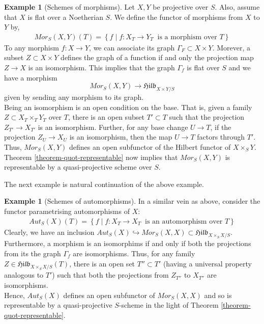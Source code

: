 \documentclass[11pt]{amsart}
\theoremstyle{definition}
\newtheorem{example}[theorem]{Example}
\begin{document}
\begin{example}[Schemes of morphisms]
	\label{example-parametrising-morphisms}
	Let $X, Y$ be projective over $S$. Also, assume that $X$ is flat over a Noetherian $S$. We define the functor of morphisms from $X$ to $Y$ by,
	\begin{align*}
	Mor_S(X,Y)(T)=\left\{f\;|\;f:X_T\rightarrow Y_T \;\;\text{is a morphism over $T$}\right\}
	\end{align*}
	To any morphism $f:X\rightarrow Y$, we can associate its graph $\Gamma_F\subset X\times Y$. Morever, a subset $Z\subset X\times Y$ defines the graph of a function if and only the projection map $Z\rightarrow X$ is an isomorphism. This implies that the graph $\Gamma_f$ is flat over $S$ and we have a morphism
	\[Mor_S(X,Y) \rightarrow \mathfrak{Hilb}_{X\times Y/S}\]
	given by sending any morphism to its graph.\\
	Being an isomorphism is an open condition on the base. That is, given a family $Z\subset X_T\times_T Y_T$ over $T$, there is an open subset $T'\subset T$ such that the projection $Z_{T'}\rightarrow X_{T'}$ is an isomorphism. Further, for any base change $U\rightarrow T$, if the projection $Z_U\rightarrow X_U$ is an isomorphism, then the map $U\rightarrow T$ factors through $T'$. Thus, $Mor_S(X,Y)$ defines an open subfunctor of the Hilbert functor of $X\times_S Y$.\\
	Theorem \ref{theorem-quot-representable} now implies that $Mor_S(X,Y)$ is representable by a quasi-projective scheme over $S$.
\end{example}
The next example is natural continuation of the above example.
	
\begin{example}[Schemes of automorphisms]
	\label{example-parametrising-automorphisms}
	In a similar vein as above, consider the functor parametrising automorphisms of $X$:
	\begin{align*}
	Aut_S(X)(T)=\left\{f\;|\;f:X_T\rightarrow X_T \;\;\text{is an automorphism over $T$}\right\}
	\end{align*}
	Clearly, we have an inclusion $Aut_S(X)\hookrightarrow Mor_S(X,X)\subset \mathfrak{Hilb}_{X\times_S X/S}$. Furthermore, a morphism is an isomorphims if and only if both the projections from its the graph $\Gamma_f$ are isomorphisms. Thus, for any family $Z\in\mathfrak{Hilb}_{X\times_S X/S}(T)$, there is an open set $T''\subset T'$ (having a universal property analogous to $T'$) such that both the projections from $Z_{T''}$ to $X_{T''}$ are isomorphisms.\\
	Hence, $Aut_S(X)$ defines an open subfunctor of $Mor_S(X,X)$ and so is representable by a quasi-projective $S$-scheme in the light of Theorem \ref{theorem-quot-representable}.
\end{example}
\end{document}
